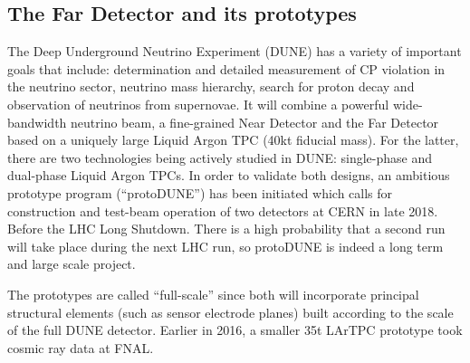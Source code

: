 \documentclass[pdftex,12pt,letter]{article}
\begin{document}
\subsection{The Far Detector and its prototypes}
The Deep Underground Neutrino Experiment (DUNE) has a variety of important goals that
include:
determination and detailed measurement of CP violation in the neutrino sector,
neutrino mass hierarchy, search for proton decay and observation of neutrinos from supernovae.
It will combine a powerful wide-bandwidth neutrino beam, a fine-grained Near Detector and
the Far Detector based on a uniquely large Liquid Argon TPC (40kt fiducial mass). For the latter,
there are two technologies being actively studied in DUNE: single-phase and dual-phase Liquid Argon TPCs.
In order to validate both designs, an ambitious prototype program (``protoDUNE'') has been initiated which calls
for construction and test-beam operation of two detectors at CERN in late 2018. Before the LHC Long Shutdown.
There is a high probability that a second run will take place during the next LHC run, so protoDUNE is indeed a long
term and large scale project.

The  prototypes are called ``full-scale''
since both will incorporate principal structural elements (such as sensor electrode planes) built according to the scale
of the full DUNE detector. Earlier in 2016, a smaller 35t LArTPC prototype took cosmic ray data at FNAL.
\end{document}
